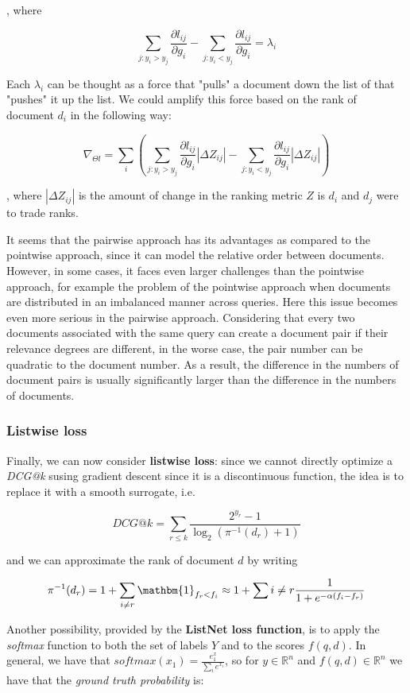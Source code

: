 , where

$$
\sum_{j : y_i > y_j} \frac{\partial l_{ij}}{\partial g_i} - \sum_{j : y_i < y_j} \frac{\partial l_{ij}}{\partial g_i} = \lambda_i
$$

Each $\lambda_i$ can be thought as a force that "pulls" a document down the list of that "pushes" it up the list. We could amplify this force based on the rank of document $d_i$ in the following way:

$$
\nabla_{\Theta l} = \sum_i \left( \sum_{j : y_i > y_j} \frac{\partial l_{ij}}{\partial g_i} |\Delta Z_{ij}| - \sum_{j : y_i < y_j} \frac{\partial l_{ij}}{\partial g_i} |\Delta Z_{ij}| \right)
$$

, where $|\Delta Z_{ij}|$ is the amount of change in the ranking metric $Z$ is $d_i$ and $d_j$ were to trade ranks.

It seems that the pairwise approach has its advantages as compared to the pointwise approach, since it can model the relative order between documents. However, in some cases, it faces even larger challenges than the pointwise approach, for example the problem of the pointwise approach when documents are distributed in an imbalanced manner across queries. Here this issue becomes even more serious in the pairwise approach. Considering that every two documents associated with the same query can create a document pair if their relevance degrees are different, in the worse case, the pair number can be quadratic to the document number. As a result, the difference in the numbers of document pairs is usually significantly larger than the difference in the numbers of documents.

\subsubsection{Listwise loss}

Finally, we can now consider \textbf{listwise loss}: since we cannot directly optimize a \textit{DCG@k} susing gradient descent since it is a discontinuous function, the idea is to replace it with a smooth surrogate, i.e.

$$
DCG@k = \sum_{r \leq k} \frac{2^{y_r} - 1}{\log_2 (\pi^{-1}(d_r) + 1)}
$$

and we can approximate the rank of document $d$ by writing

$$
\pi^{-1}(d_r) = 1 + \sum_{i \neq r} \mathbm{1}_{f_r < f_i} \approx 1 + \sum{i \neq r} \frac{1}{1 + e^{- \alpha (f_i - f_r)}}
$$

Another possibility, provided by the \textbf{ListNet loss function}, is to apply the \textit{softmax} function to both the set of labels $Y$ and to the scores $f(q,d)$. In general, we have that $softmax(x_1) = \frac{e^x_1}{\sum_i e^{x_i}}$, so for $y \in \mathbb{R}^n$ and $f(q,d) \in \mathbb{R}^n$ we have that the \textit{ground truth probability} is:

